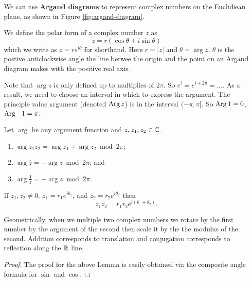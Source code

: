We can use \textbf{Argand diagrams} to represent complex numbers on the Euclidiean plane, as shown in Figure \ref{fig:argand-diagram}.

\begin{definition}
    We define the polar form of a complex number $z$ as \[ z = r(\cos{\theta} + i \sin{\theta}) \] which we write as $z = re^{i\theta}$ for shorthand. Here $r = \lvert z \rvert$ and $\theta = \arg{z}$. $\theta$ is the postive anticlockwise angle the line betwee the origin and the point on an Argand diagram makes with the positive real axis. 
\end{definition}

\begin{remark}
    Note that $\arg{z}$ is only defined up to multiplies of $2\pi$. So $e^{i}=e^{i + 2\pi} = \ldots$. As a result, we need to choose an interval in which to express the argument. The principle value argument (denoted $\operatorname{Arg}{z}$) is in the interval $(-\pi, \pi]$. So $\operatorname{Arg}{1} = 0$, $\operatorname{Arg}{-1} = \pi$.
\end{remark}

\begin{lemma}
    Let $\arg{}$ be any argument function and $z, z_1, z_2 \in \mathbb{C}$.
    \begin{enumerate}
        \item $\arg{z_1z_2} = \arg{z_1} + \arg{z_2} \bmod 2\pi$;
        \item $\arg{\bar{z}} = -\arg{z} \bmod 2\pi$; and
        \item $\arg{\frac1z}=-\arg{z} \bmod 2\pi$.
    \end{enumerate}
\end{lemma}

\begin{lemma}
    If $z_1, z_2 \neq 0$, $z_1 = r_1e^{i\theta_1}$, and $z_2=r_2e^{i\theta_2}$ then \[ z_1z_2 = r_1r_2e^{i(\theta_1+\theta_2)}. \]
\end{lemma}

Geometrically, when we multiple two complex numbers we rotate by the first number by the argument of the second then scale it by the the modulus of the second. Addition corresponds to translation and conjugation corresponds to reflection along the $\mathbb{R}$ line.

\begin{proof}
    The proof for the above Lemma is easily obtained via the composite angle formula for $\sin$ and $\cos$.
\end{proof}
